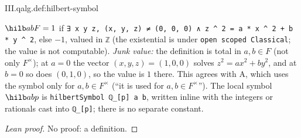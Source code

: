 \begin{definition}
\end{definition}
\begin{tfformal}{III.qalg.def:hilbert-symbol}
\begin{tffidelity}
$\hilb abF=1$ if \texttt{∃ x y z, (x, y, z) ≠ (0, 0, 0) ∧ z \textasciicircum{} 2 = a * x \textasciicircum{} 2 + b * y \textasciicircum{} 2}, else $-1$, valued in \texttt{ℤ} (the existential is under \texttt{open scoped Classical}; the value is not computable). \emph{Junk value:} the definition is total in $a,b\in F$ (not only $F^\times$); at $a=0$ the vector $(x,y,z)=(1,0,0)$ solves $z^2=ax^2+by^2$, and at $b=0$ so does $(0,1,0)$, so the value is $1$ there. This agrees with A, which uses the symbol only for $a,b\in F^\times$ (``it is used for $a,b\in F^\times$''). The local symbol $\hilb abp$ is \texttt{hilbertSymbol ℚ\_[p] a b}, written inline with the integers or rationals cast into \texttt{ℚ\_[p]}; there is no separate constant.
\end{tffidelity}
\end{tfformal}
\begin{proof}[Lean proof]
No proof: a definition.
\end{proof}

